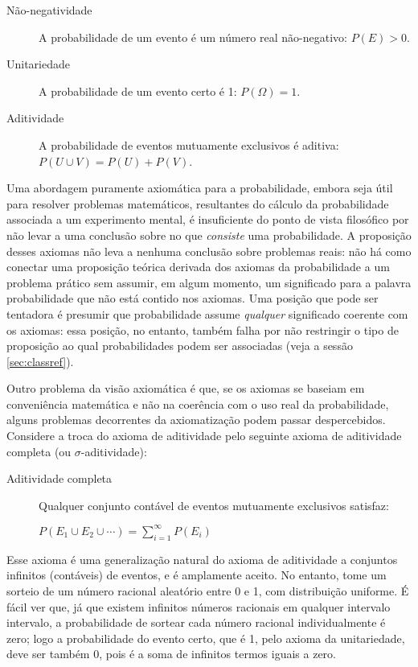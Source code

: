 \begin{description}
	\item[Não-negatividade] A probabilidade de um evento é um número real não-negativo: $P(E) > 0$.
	\item[Unitariedade] A probabilidade de um evento certo é 1: $P(\Omega) = 1$.
	\item[Aditividade] A probabilidade de eventos mutuamente exclusivos é aditiva: $P(U \cup V) = P(U)+P(V)$.
\end{description}

Uma abordagem puramente axiomática para a probabilidade, embora seja útil para resolver problemas matemáticos, resultantes do
cálculo da probabilidade associada a um experimento mental, é insuficiente do ponto de vista filosófico por não 
levar a uma conclusão sobre no que {\em consiste} uma probabilidade. A proposição desses axiomas não leva a nenhuma conclusão 
sobre problemas reais: não há como conectar uma proposição teórica derivada dos axiomas da probabilidade a um problema
prático sem assumir, em algum momento, um significado para a palavra probabilidade que não está contido nos axiomas. Uma posição
que pode ser tentadora é presumir que probabilidade assume {\em qualquer} significado coerente com os axiomas: essa posição,
no entanto, também falha por não restringir o tipo de proposição ao qual probabilidades podem ser associadas (veja a sessão
\ref{sec:classref}). 

Outro problema da visão axiomática é que, se os axiomas se baseiam em conveniência matemática e não na coerência com o uso 
real da probabilidade, alguns problemas decorrentes da axiomatização podem passar despercebidos. Considere a troca do axioma
de aditividade pelo seguinte axioma de aditividade completa (ou $\sigma$-aditividade):

\begin{description}
	\item[Aditividade completa] Qualquer conjunto contável de eventos mutuamente exclusivos satisfaz:

		$P(E_1 \cup E_2 \cup \cdots) = \sum_{i=1}^\infty P(E_i)$
\end{description}

Esse axioma é uma generalização natural do axioma de aditividade a conjuntos infinitos (contáveis) de eventos, e é amplamente
aceito. No entanto, tome um sorteio de um número racional aleatório entre 0 e 1, com distribuição uniforme. É fácil ver que,
já que existem infinitos números racionais em qualquer intervalo intervalo,
a probabilidade de sortear cada número racional individualmente é zero; logo a probabilidade do evento certo, que é 1, 
pelo axioma da unitariedade, deve ser também 0, pois é a soma de infinitos termos iguais a zero.

